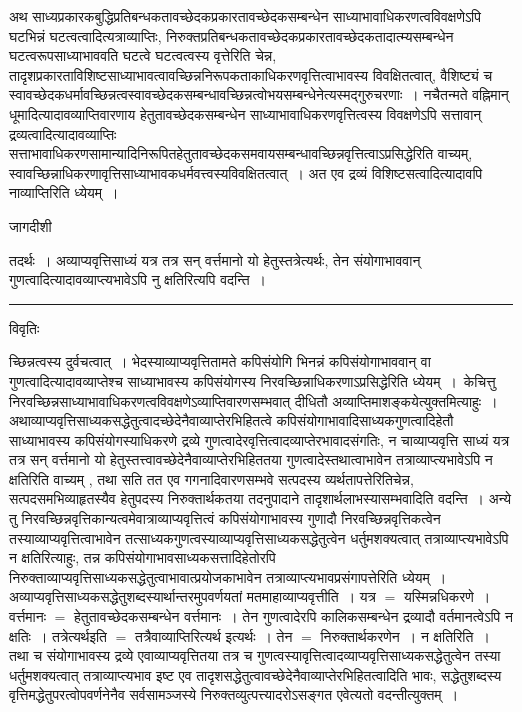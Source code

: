 \documentclass[10pt, openany]{book}
\begin{document}
{अथ साध्यप्रकारकबुद्धिप्रतिबन्धकतावच्छेदकप्रकारतावच्छेदकसम्बन्धेन साध्याभावाधिकरणत्वविवक्षणेऽपि घटभिन्नं घटत्वत्वादित्यत्राव्याप्तिः,
निरुक्तप्रतिबन्धकतावच्छेदकप्रकारतावच्छेदकतादात्म्यसम्बन्धेन घटत्वरूपसाध्याभाववति घटत्वे घटत्वत्वस्य वृत्तेरिति
चेन्न, तादृशप्रकारताविशिष्टसाध्याभावत्वावच्छिन्ननिरूपकताकाधिकरणवृत्तित्वाभावस्य विवक्षितत्वात्, वैशिष्ट्यं च स्वावच्छेदकधर्मावच्छिन्नत्वस्वावच्छेदकसम्बन्धावच्छिन्नत्वोभयसम्बन्धेनेत्यस्मद्गुरुचरणाः~। नचैतन्मते वह्निमान् धूमादित्यादावव्याप्तिवारणाय हेतुतावच्छेदकसम्बन्धेन
साध्याभावाधिकरणवृत्तित्वस्य विवक्षणेऽपि सत्तावान् द्रव्यत्वादित्यादावव्याप्तिः सत्ताभावाधिकरणसामान्यादिनिरूपितहेतुतावच्छेदकसमवायसम्बन्धावच्छिन्नवृत्तित्वाऽप्रसिद्धेरिति वाच्यम्, स्वावच्छिन्नाधिकरणावृत्तिसाध्याभावकधर्मवत्त्वस्यविवक्षितत्वात्~। अत एव द्रव्यं विशिष्टसत्वादित्यादावपि नाव्याप्तिरिति ध्येयम्~।
\newpage
\begin{center} जागदीशी \end{center}
{\la तदर्थः~। अव्याप्यवृत्तिसाध्यं यत्र तत्र सन् वर्त्तमानो यो हेतुस्तत्रेत्यर्थः, तेन संयोगाभाववान् गुणत्वादित्यादावव्याप्त्यभावेऽपि नु क्षतिरित्यपि वदन्ति~।}\\
\hrule
\begin{center}     विवृतिः \end{center}
च्छिन्नत्वस्य दुर्वचत्वात्~। भेदस्याव्याप्यवृत्तितामते कपिसंयोगि भिनन्नं कपिसंयोगाभाववान् वा गुणत्वादित्यादावव्याप्तेश्च साध्याभावस्य कपिसंयोगस्य निरवच्छिन्नाधिकरणाऽप्रसिद्धेरिति ध्येयम्~।~{\la केचित्तु} निरवच्छिन्नसाध्याभावाधिकरणत्वविवक्षणेऽव्याप्तिवारणसम्भवात् दीधितौ {\qt अव्याप्तिमाशङ्कये}त्युक्तमित्याहुः~।
अथाव्याप्यवृत्तिसाध्यकसद्धेतुत्वादच्छेदेनैवाव्याप्तेरभिहितत्वे कपिसंयोगाभावादिसाध्यकगुणत्वादिहेतौ साध्याभावस्य कपिसंयोगस्याधिकरणे द्रव्ये गुणत्वादेरवृत्तित्वादव्याप्तेरभावादसंगतिः, न चाव्याप्यवृत्ति साध्यं यत्र तत्र सन् वर्त्तमानो यो हेतुस्तत्त्वावच्छेदेनैवाव्याप्तेरभिहिततया गुणत्वादेस्तथात्वाभावेन
तत्राव्याप्त्यभावेऽपि न क्षतिरिति वाच्यम् , तथा सति तत एव गगनादिवारणसम्भवे सत्पदस्य व्यर्थतापत्तेरितिचेन्न, सत्पदसमभिव्याहृतस्यैव हेतुपदस्य निरुक्तार्थकतया
तदनुपादाने तादृशार्थलाभस्यासम्भवादिति वदन्ति~। अन्ये तु निरवच्छिन्नवृत्तिकान्यत्वमेवात्राव्याप्यवृत्तित्वं कपिसंयोगाभावस्य गुणादौ निरवच्छिन्नवृत्तिकत्वेन
तस्याव्याप्यवृत्तित्वाभावेन तत्साध्यकगुणत्वस्याव्याप्यवृत्तिसाध्यकसद्धेतुत्वेन धर्तुमशक्यत्वात् तत्राव्याप्त्यभावेऽपि न क्षतिरित्याहुः, तन्न कपिसंयोगाभावसाध्यकसत्तादिहेतोरपि
निरुक्ताव्याप्यवृत्तिसाध्यकसद्धेतुत्वाभावात्प्रयोजकाभावेन तत्राव्याप्त्यभावप्रसंगापत्तेरिति ध्येयम्~। अव्याप्यवृत्तिसाध्यकसद्धेतुशब्दस्यार्थान्तरमुपवर्णयतां मतमाहाव्याप्यवृत्तीति~। यत्र $=$ यस्मिन्नधिकरणे~। वर्त्तमानः $=$  हेतुतावच्छेदकसम्बन्धेन वर्त्तमानः~। तेन गुणत्वादेरपि कालिकसम्बन्धेन द्रव्यादौ वर्तमानत्वेऽपि न क्षतिः~। तत्रेत्यर्थइति $=$ तत्रैवाव्याप्तिरित्यर्थ इत्यर्थः~। तेन $=$ निरुक्तार्थकरणेन~। न क्षतिरिति~। तथा च संयोगाभावस्य द्रव्ये एवाव्याप्यवृत्तितया तत्र च गुणत्वस्यावृत्तित्वादव्याप्यवृत्तिसाध्यकसद्धेतुत्वेन तस्या धर्तुमशक्यत्वात् तत्राव्याप्त्यभाव इष्ट एव तादृशसद्धेतुत्वावच्छेदेनैवाव्याप्तेरभिहितत्वादिति भावः, सद्धेतुशब्दस्य वृत्तिमद्धेतुपरत्वोपवर्णनेनैव सर्वसामञ्जस्ये निरुक्तव्युत्पत्त्यादरोऽसङ्गत एवेत्यतो वदन्तीत्युक्तम्~।\\

}
\end{document}
